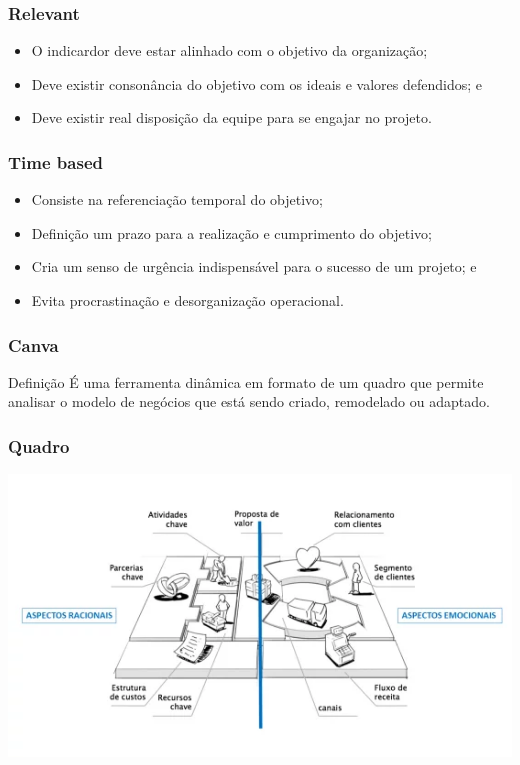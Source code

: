 \documentclass[aspectratio=169]{beamer}
\begin{document}
\begin{frame}
	\frametitle{Relevant}

	\begin{itemize}
		\item O indicardor deve estar alinhado com o objetivo da organiza\c cão;
		\item Deve existir consonância do objetivo com os ideais e valores defendidos; e
		\item Deve existir real disposição da equipe para se engajar no projeto.
	\end{itemize}
\end{frame}

\begin{frame}
	\frametitle{Time based}

	\begin{itemize}
		\item Consiste na referenciação temporal do objetivo;
		\item Definição um prazo para a realização e cumprimento do objetivo;
		\item Cria um senso de urgência indispensável para o sucesso de um projeto; e
		\item Evita procrastinação e desorganização operacional.
	\end{itemize}
\end{frame}

\begin{frame}
	\frametitle{Canva}

	\begin{block}{Defini\c cão}
		É uma ferramenta dinâmica em formato de um quadro que permite analisar o modelo de negócios que está sendo criado, remodelado ou adaptado.
	\end{block}
\end{frame}

\begin{frame}
	\frametitle{Quadro}
	
	\begin{center}
			\includegraphics[scale=0.7]{img/canva}
	\end{center}
\end{frame}
\end{document}
